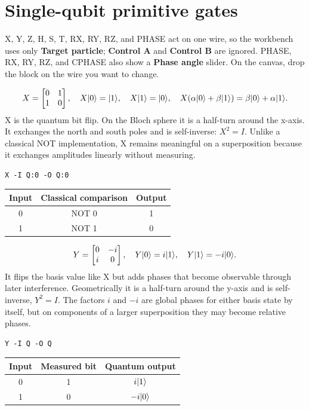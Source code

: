\section{Single-qubit primitive gates}

\begin{beginnerbox}
X, Y, Z, H, S, T, RX, RY, RZ, and PHASE act on one wire, so the workbench uses only
\textbf{Target particle}; \textbf{Control A} and \textbf{Control B} are
ignored. PHASE, RX, RY, RZ, and CPHASE also show a \textbf{Phase angle} slider. On the canvas, drop
the block on the wire you want to change.
\end{beginnerbox}


\[
X=\begin{bmatrix}0&1\\1&0\end{bmatrix},\quad
X\lvert 0\rangle=\lvert 1\rangle,\quad X\lvert 1\rangle=\lvert 0\rangle,\quad
X(\alpha\lvert 0\rangle+\beta\lvert 1\rangle)=\beta\lvert 0\rangle+\alpha\lvert 1\rangle.
\]
X is the quantum bit flip. On the Bloch sphere it is a half-turn around the
x-axis. It exchanges the north and south poles and is self-inverse:
$X^2=I$. Unlike a classical NOT implementation, X remains meaningful on a
superposition because it exchanges amplitudes linearly without measuring.
\begin{lstlisting}
X -I Q:0 -O Q:0
\end{lstlisting}
\begin{center}
\begin{tabular}{ccc}\toprule Input & Classical comparison & Output\\\midrule
0 & NOT 0 & 1\\
1 & NOT 1 & 0\\\bottomrule\end{tabular}
\end{center}


\[
Y=\begin{bmatrix}0&-i\\i&0\end{bmatrix},\quad
Y\lvert 0\rangle=i\lvert 1\rangle,\quad Y\lvert 1\rangle=-i\lvert 0\rangle.
\]
It flips the basis value like X but adds phases that become observable through
later interference. Geometrically it is a half-turn around the y-axis and is
self-inverse, $Y^2=I$. The factors $i$ and $-i$ are global phases for either
basis state by itself, but on components of a larger superposition they may
become relative phases.
\begin{lstlisting}
Y -I Q -O Q
\end{lstlisting}
\begin{center}
\begin{tabular}{ccc}\toprule Input & Measured bit & Quantum output\\\midrule
0 & 1 & $i\lvert 1\rangle$\\
1 & 0 & $-i\lvert 0\rangle$\\\bottomrule\end{tabular}
\end{center}

